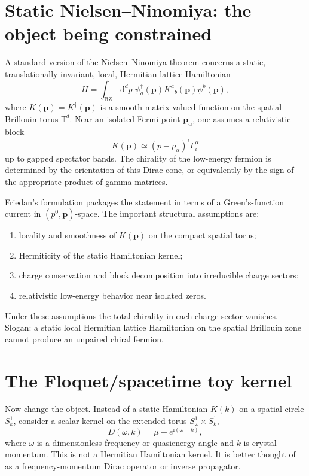 \documentclass[11pt]{article}
\newcommand{\dd}{\,\mathrm{d}}
\newcommand{\ii}{\mathrm{i}}
\newcommand{\TT}{\mathbb{T}}
\newcommand{\BZ}{\mathrm{BZ}}
\begin{document}
\section{Static Nielsen--Ninomiya: the object being constrained}

A standard version of the Nielsen--Ninomiya theorem concerns a static, translationally invariant, local, Hermitian lattice Hamiltonian
\begin{equation}
  H=\int_{\BZ}\dd^d p\; \psi_a^\dagger(\bm p)K^a{}_b(\bm p)\psi^b(\bm p),
\end{equation}
where \(K(\bm p)=K^\dagger(\bm p)\) is a smooth matrix-valued function on the spatial Brillouin torus \(\TT^d\).  Near an isolated Fermi point \(\bm p_\alpha\), one assumes a relativistic block
\begin{equation}
  K(\bm p)\simeq (p-p_\alpha)^i\Gamma_i^\alpha
\end{equation}
up to gapped spectator bands.  The chirality of the low-energy fermion is determined by the orientation of this Dirac cone, or equivalently by the sign of the appropriate product of gamma matrices.

Friedan's formulation packages the statement in terms of a Green's-function current in \((p^0,\bm p)\)-space.  The important structural assumptions are:
\begin{enumerate}[label=(\alph*)]
  \item locality and smoothness of \(K(\bm p)\) on the compact spatial torus;
  \item Hermiticity of the static Hamiltonian kernel;
  \item charge conservation and block decomposition into irreducible charge sectors;
  \item relativistic low-energy behavior near isolated zeros.
\end{enumerate}
Under these assumptions the total chirality in each charge sector vanishes.  Slogan: a static local Hermitian lattice Hamiltonian on the spatial Brillouin zone cannot produce an unpaired chiral fermion.

\section{The Floquet/spacetime toy kernel}

Now change the object.  Instead of a static Hamiltonian \(K(k)\) on a spatial circle \(S^1_k\), consider a scalar kernel on the extended torus \(S^1_\omega\times S^1_k\),
\begin{equation}
  D(\omega,k)=\mu-e^{\ii(\omega-k)},
  \label{eq:D}
\end{equation}
where \(\omega\) is a dimensionless frequency or quasienergy angle and \(k\) is crystal momentum.  This is not a Hermitian Hamiltonian kernel.  It is better thought of as a frequency-momentum Dirac operator or inverse propagator.
\end{document}
